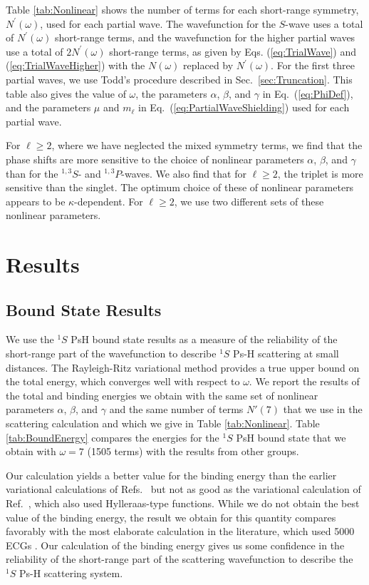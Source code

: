 \documentclass[preprint,showpacs,showkeys,preprintnumbers,amsmath,amssymb,longbibliography,pra,aps]{revtex4-1}
\begin{document}
Table \ref{tab:Nonlinear} shows
the number of terms for each short-range 
symmetry, $N^\prime(\omega)$, used for each partial wave. The wavefunction
for the $S$-wave uses a 
total of $N^\prime(\omega)$ short-range terms, and the wavefunction for the
higher partial waves 
use a total of $2 N^\prime(\omega)$ short-range terms, as given by Eqs.
(\ref{eq:TrialWave}) and (\ref{eq:TrialWaveHigher}) with the 
$N(\omega)$ replaced by $N^\prime(\omega)$.
For the first three partial waves,
we use Todd's procedure described in Sec.~\ref{sec:Truncation}.
This table also gives the value of $\omega$, the parameters $\alpha$, $\beta$, and
$\gamma$ in Eq.~(\ref{eq:PhiDef}), and the parameters $\mu$ and $m_\ell$ in 
Eq.~(\ref{eq:PartialWaveShielding}) used for each partial wave.

For $\ell \geq 2$, where we have neglected the mixed symmetry terms,
we find that the phase shifts are more sensitive to the
choice of nonlinear parameters $\alpha$, $\beta$, and $\gamma$
than for the $^{1,3}S$- and $^{1,3}P$-waves. We also find that for $\ell \geq 2$,
the triplet is more sensitive than the singlet. The optimum choice of these
of nonlinear parameters appears to be $\kappa$-dependent. For $\ell \geq 2$, we
use two different sets of these nonlinear parameters.


\section{Results}
\label{sec:Results}

\subsection{Bound State Results}

We use the $^1S$ PsH bound state results as a measure of the reliability of the 
short-range part of the wavefunction to describe $^1S$ Ps-H scattering at
small distances. The Rayleigh-Ritz variational method provides a true upper
bound on the total energy, which converges well with respect to $\omega$.
We report the results of the total and binding energies we obtain with the
same set of nonlinear parameters $\alpha$, $\beta$, and $\gamma$ and the
same number of terms $N'(7)$ that we use in the scattering calculation and
which we give in Table \ref{tab:Nonlinear}. Table \ref{tab:BoundEnergy}
compares the energies for the $^1S$ PsH bound state that we obtain with
$\omega = 7$ (1505 terms) with the results from other groups.

Our calculation yields a better value for the binding energy than the earlier 
variational calculations of Refs.~\cite{VanReeth2003,VanReeth2004} but not
as good as the variational calculation of Ref.~\cite{Yan1999}, which also
used Hylleraas-type functions. While we do not obtain the best value of the 
binding energy, the result
we obtain for this quantity compares favorably with the most elaborate 
calculation in the literature, which used 5000 ECGs \cite{Bubin2006}. Our 
calculation of the binding energy gives us some confidence in the reliability 
of the short-range part of the scattering wavefunction to describe the $^1S$ 
Ps-H scattering system.
\end{document}
